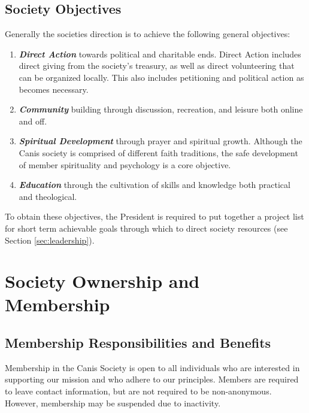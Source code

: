 \documentclass[]{article}
\begin{document}
\subsection{Society Objectives}
\label{subsec:objectives} 
 
Generally the societies direction is to achieve the following general objectives: 
 
\begin{enumerate}
\item \textbf{\textit{Direct Action}} towards political and charitable ends. Direct Action includes direct giving from the society's treasury, as well as direct volunteering that can be organized locally. This also includes petitioning and political action as becomes necessary. 
\item \textbf{\textit{Community}} building through discussion, recreation, and leisure both online and off. 
\item \textit{\textbf{Spiritual Development}} through prayer and spiritual growth. Although the Canis society is comprised of different faith traditions, the safe development of member spirituality and psychology is a core objective.
\item \textit{\textbf{Education}} through the cultivation of skills and knowledge both practical and theological.
\end{enumerate}

\vspace{2mm}
\noindent 
To obtain these objectives, the President is required to put together a project list for short term achievable goals through which to direct society resources (see Section \ref{sec:leadership}).

\clearpage

\section{Society Ownership and Membership}
\label{sec:members_owners}



\subsection{Membership Responsibilities and Benefits}
\label{subsec:members}

Membership in the Canis Society is open to all individuals who are interested in supporting our mission and who adhere to our principles. Members are required to leave contact information, but are not required to be non-anonymous. However, membership may be suspended due to inactivity. 
\end{document}
